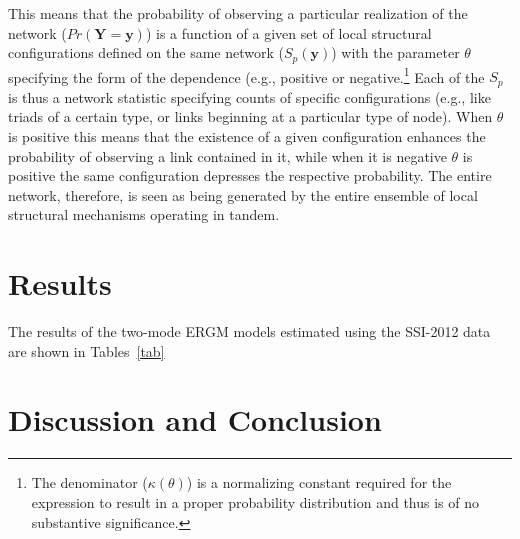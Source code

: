 \documentclass[preprint,12pt,authoryear]{elsarticle}
\begin{document}
This means that the probability of observing a particular realization of the network ($Pr(\mathbf{Y} = \mathbf{y})$) is a function of a given set of local structural configurations defined on the same network ($S_p(\mathbf{y})$) with the parameter $\theta$ specifying the form of the dependence (e.g., positive or negative.\footnote{The denominator ($\kappa(\theta)$) is a normalizing constant required for the expression to result in a proper probability distribution and thus is of no substantive significance.} Each of the $S_p$ is thus a network statistic specifying counts of specific configurations (e.g., like triads of a certain type, or links beginning at a particular type of node). When $\theta$ is positive this means that the existence of a given configuration enhances the probability of observing a link contained in it, while when it is negative $\theta$ is positive the same configuration depresses the respective probability. The entire network, therefore, is seen as being generated by the entire ensemble of local structural mechanisms operating in tandem. 

\section{Results}
\label{sec:results}
The results of the two-mode ERGM models estimated using the SSI-2012 data are shown in Tables~\ref{tab}
\section{Discussion and Conclusion}
\label{sec:disc}
\newpage

\newpage

\newpage






\newpage
 




\end{document}
